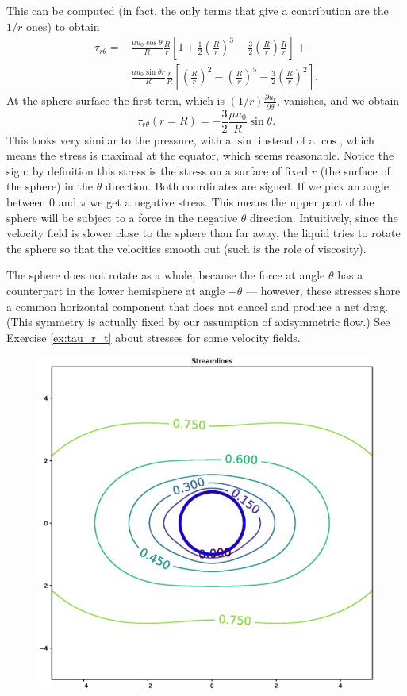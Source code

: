This can be computed (in fact, the only terms that give a contribution
are the $1/r$ ones) to obtain
\begin{align*}
  \tau_{r\theta}  =
  &
    \frac{\mu u_0 \cos\theta  }{R}
    \frac{ R  }{r}
    \left[
    1+
    \frac12   \left(\frac{R}{r}\right)^3 -
    \frac32   \left(\frac{R}{r}\right)
    \frac{R}{r}
    \right] + \\
  &  \frac{\mu u_0 \sin\theta r }{R}
    \frac{ r  }{R}
    \left[
    \left(\frac{R}{r}\right)^2 -
    \left(\frac{R}{r}\right)^5 -
    \frac32   \left(\frac{R}{r}\right)^2
    \right] .
\end{align*}
At the sphere surface the first term, which is
$ (1/r) \frac{\partial u_r}{\partial \theta} $, vanishes, and we
obtain
\[
  \tau_{r\theta} (r=R) =  - \frac32 \frac{\mu u_0}{R}  \sin\theta .
\]
This looks very similar to the pressure, with a $\sin$ instead of a
$\cos$, which means the stress is maximal at the equator, which seems
reasonable. Notice the sign: by definition this stress is the stress
on a surface of fixed $r$ (the surface of the sphere) in the $\theta$
direction. Both coordinates are signed. If we pick an angle between
$0$ and $\pi$ we get a negative stress. This means the upper part of
the sphere will be subject to a force in the negative $\theta$
direction. Intuitively, since the velocity field is slower close to
the sphere than far away, the liquid tries to rotate the sphere so
that the velocities smooth out (such is the role of viscosity).

The sphere does not rotate as a whole, because the force at angle
$\theta$ has a counterpart in the lower hemisphere at angle $-\theta$
--- however, these stresses share a common horizontal component that
does not cancel and produce a net drag. (This symmetry is actually
fixed by our assumption of axisymmetric flow.) See Exercise
\ref{ex:tau_r_t} about stresses for some velocity fields.

\begin{figure}
  \centering
  \includegraphics[width=0.8\linewidth]{figures/creeping_flow_past_sphere_vel}
  \caption{\label{fig:creeping_flow_past_sphere_vel}}
\end{figure}


